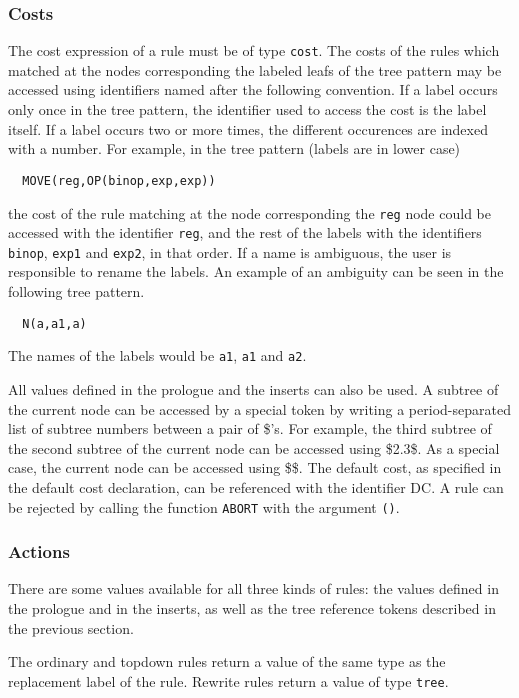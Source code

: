 \subsubsection{Costs}
The cost expression of a rule must be of type {\tt cost}. The costs
of the rules which matched at the nodes corresponding the labeled
leafs of the tree pattern may be accessed using identifiers named
after the following convention. If a label occurs only once
in the tree pattern, the identifier used to access the cost is the
label itself. If a label occurs two or more times, the different
occurences are indexed with a number. For example, in the tree
pattern (labels are in lower case)
\begin{verbatim}
  MOVE(reg,OP(binop,exp,exp))
\end{verbatim}
the cost of the rule matching at the node corresponding the {\tt reg}
node could be accessed with the identifier {\tt reg}, and the rest of
the labels with the identifiers {\tt binop}, {\tt exp1} and {\tt exp2},
in that order. If a name is ambiguous, the user is responsible to rename
the labels. An example of an ambiguity can be seen in the following
tree pattern.
\begin{verbatim}
  N(a,a1,a)
\end{verbatim}
The names of the labels would be {\tt a1}, {\tt a1} and {\tt a2}.

All values defined in the prologue and the inserts can also be used.
A subtree of the current node can be accessed by a special token
by writing a period-separated list of subtree numbers between a
pair of \$'s. For example, the third subtree of the second subtree
of the current node can be accessed using \$2.3\$. As a special case,
the current node can be accessed using \$\$. The default cost,
as specified in the default cost declaration, can be referenced
with the identifier DC. A rule can be rejected by calling
the function {\tt ABORT} with the argument {\tt ()}.

\subsubsection{Actions}
There are some values available for all three kinds of rules:
the values defined in the prologue and in the inserts,
as well as the tree reference tokens described in the previous section.

The ordinary and topdown rules return a value of the same type as the
replacement label of the rule. Rewrite rules return a value of type {\tt tree}.

